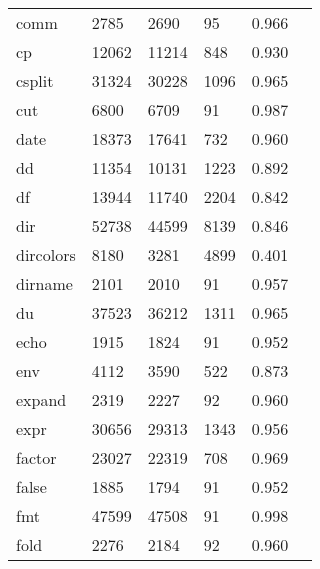 \begin{longtable}{lp{2.40cm}p{2.40cm}p{2.40cm}p{2.40cm}p{2.40cm}}
comm      &                     2785 &         2690 &            95 &                    0.966 \\
cp        &                    12062 &        11214 &           848 &                    0.930 \\
csplit    &                    31324 &        30228 &          1096 &                    0.965 \\
cut       &                     6800 &         6709 &            91 &                    0.987 \\
date      &                    18373 &        17641 &           732 &                    0.960 \\
dd        &                    11354 &        10131 &          1223 &                    0.892 \\
df        &                    13944 &        11740 &          2204 &                    0.842 \\
dir       &                    52738 &        44599 &          8139 &                    0.846 \\
dircolors &                     8180 &         3281 &          4899 &                    0.401 \\
dirname   &                     2101 &         2010 &            91 &                    0.957 \\
du        &                    37523 &        36212 &          1311 &                    0.965 \\
echo      &                     1915 &         1824 &            91 &                    0.952 \\
env       &                     4112 &         3590 &           522 &                    0.873 \\
expand    &                     2319 &         2227 &            92 &                    0.960 \\
expr      &                    30656 &        29313 &          1343 &                    0.956 \\
factor    &                    23027 &        22319 &           708 &                    0.969 \\
false     &                     1885 &         1794 &            91 &                    0.952 \\
fmt       &                    47599 &        47508 &            91 &                    0.998 \\
fold      &                     2276 &         2184 &            92 &                    0.960 \\

\end{longtable}
